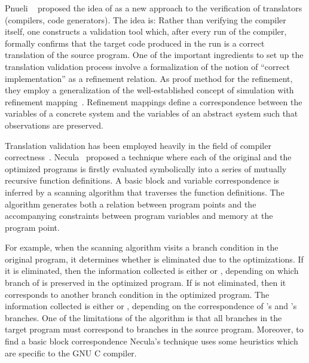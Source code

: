 Pnueli \etal~\cite{Pnueli:1998} proposed the idea of \tv as a new approach to
the verification of translators (compilers, code generators). The idea is:
Rather than verifying the compiler itself, one constructs a validation tool
which, after every run of the compiler, formally confirms that the target code
produced in the run is a correct translation of the source program. One of the
important ingredients  to set up the  translation validation process involve a
formalization of the notion of ``correct implementation'' as a refinement
relation. As proof method for the refinement, they employ a generalization of
the well-established concept of simulation with refinement
mapping~\cite{Abadi:1991}. Refinement mappings define a correspondence between
the variables of a concrete system and the variables of an abstract system such
that observations are preserved. 

Translation validation  has been employed heavily in the field of compiler
correctness~\cite{VOC2002,TVOC:CAV2005,Necula:2000}.  Necula~\cite{Necula:2000}
proposed a technique where each of the original and the optimized programs is
firstly evaluated symbolically into a series of mutually recursive function
definitions. A basic block and variable correspondence is inferred by a
scanning algorithm that traverses the function definitions. The algorithm
generates both a relation between program points and the accompanying
constraints between program variables and memory at the program point.  

For example, when the scanning
algorithm visits a branch condition  in the original program, it
determines whether  is eliminated due to the optimizations. If it is
eliminated, then the information collected is either  or , depending on which branch of  is preserved in the optimized program. 
%
If  is not eliminated, then it corresponds to another branch condition
 in the optimized program. The information collected is either 
or , depending on the correspondence of ’s and ’s
branches. One of the limitations of the algorithm is that all branches in the
target program must correspond to branches in the source program.   Moreover, to find
    a basic block correspondence Necula’s technique uses some heuristics which
    are specific to the GNU C compiler. 
  
